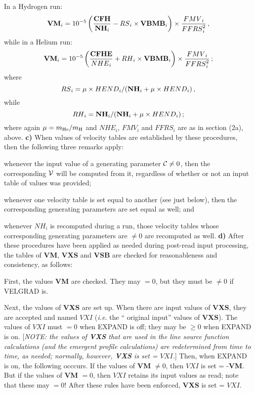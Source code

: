 In a Hydrogen run:
$$ {\bf VM}_i = 10^{-5} \left( { {\bf CFH} \over {\bf NH}_i } 
   - {RS}_i \times {\bf VBMB}_i \right) \times
   { {FMV}_i \over {FFRS}^2_i } \, , $$
while in a Helium run:
$$ {\bf VM}_i = 10^{-5} \left( { {\bf CFHE} \over {NHE}_i } 
   + {RH}_i \times {\bf VBMB}_i \right) \times
   { {FMV}_i \over {FFRS}^2_i } \, ; $$
where
$$ {RS}_i = \mu \times {HEND}_i / ( {\bf NH}_i + \mu \times {HEND}_i ) \, , $$
while
$$ {RH}_i = {\bf NH}_i / ( {\bf NH}_i + \mu \times {HEND}_i ) \, ; $$
where again $\mu = m_{\rm He} / m_{\rm H}$ and ${NHE}_i$, ${FMV}_i$ and ${FFRS}_i$ 
are as in section (2a), above.
\ej
{\bf c)} When values of velocity tables are established by these procedures, then
the following three remarks apply:

 whenever the input value of a generating
parameter ${\cal C} \neq 0$, then the corresponding $\cal V$ will be computed
from it, regardless of whether or not an input table of values was
provided;

 whenever one velocity table is set equal to another 
(see just below), then the corresponding generating parameters are set
equal as well; and

 whenever ${NH}_i$ is recomputed during a run, those
velocity tables whose corresponding generating parameters are $\neq 0$
are recomputed as well.
\blankline
\blankline
\blankline
{\bf d)} After these procedures have been applied as needed during post-read
input processing, the tables of {\bf VM}, 
{\bf VXS} and {\bf VSB} are checked for reasonableness and consistency,
as follows:

First, the values {\bf VM} are checked. They may $= 0$, but they must
be $\neq 0$ if VELGRAD is.

Next, the values of {\bf VXS} are set up. When there are input values of
{\bf VXS}, they are accepted and named ${VXI}$ ({\it i.e.} the `` original
input'' values of {\bf VXS}).
The values of ${VXI}$ must $= 0$ when EXPAND is off; they
may be $\geq 0$ when EXPAND is on. [{\it NOTE: the values of {\bf VXS} that
are used in the line source function calculations (and the emergent profile
calculations) are redetermined from time to time, as needed; {\rm normally},
however, {\bf VXS} is set = ${VXI}$.}]
Then, when EXPAND is on, the following occcurs. If the values of {\bf VM} 
$\neq 0$, then ${VXI}$ is set = -{\bf VM}. But if the values of
{\bf VM} $= 0$, then ${VXI}$ retains its input values as read; note
that these may $= 0$! After these rules have been enforced, 
{\bf VXS} is set = ${VXI}$.

